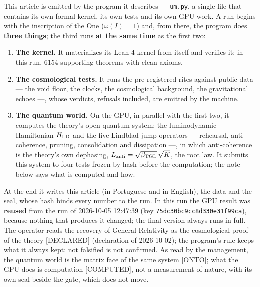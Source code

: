 \documentclass[11pt]{article}
\newcommand{\bTGL}{\beta_{\mathrm{TGL}}}\newcommand{\Msun}{M_{\odot}}\newcommand{\TGL}{\mathrm{TGL}}
\theoremstyle{definition}\newtheorem{deriv}{Derivation}
\begin{document}

This article is emitted by the program it describes --- \texttt{um.py}, a single file that contains its own formal kernel, its own tests and its own GPU work. A run begins with the inscription of the One ($\omega(I)=1$) and, from there, the program does \textbf{three things}; the third runs \textbf{at the same time} as the first two:

\begin{enumerate}

\item \textbf{The kernel.} It materializes its Lean 4 kernel from itself and verifies it: in this run, 6154 supporting theorems with clean axioms.

\item \textbf{The cosmological tests.} It runs the pre-registered rites against public data --- the void floor, the clocks, the cosmological background, the gravitational echoes ---, whose verdicts, refusals included, are emitted by the machine.

\item \textbf{The quantum world.} On the GPU, in parallel with the first two, it computes the theory's open quantum system: the luminodynamic Hamiltonian $H_{\rm LD}$ and the five Lindblad jump operators --- rehearsal, anti-coherence, pruning, consolidation and dissipation ---, in which anti-coherence is the theory's own dephasing, $L_{\rm anti}=\sqrt{\bTGL}\,\sqrt K$, the root law. It submits this system to four tests frozen by hash before the computation; the note below says what is computed and how.

\end{enumerate}

At the end it writes this article (in Portuguese and in English), the data and the seal, whose hash binds every number to the run. In this run the GPU result was \textbf{reused} from the run of 2026-10-05 12:47:39 (key \texttt{75dc30bc9cc8d330e31f99ca}), because nothing that produces it changed; the final version always runs in full. The operator reads the recovery of General Relativity as the cosmological proof of the theory \textsf{[DECLARED]} (declaration of 2026-10-02); the program's rule keeps what it always kept: not falsified is not confirmed. As read by the management, the quantum world is the matrix face of the same system \textsf{[ONTO]}; what the GPU does is computation \textsf{[COMPUTED]}, not a measurement of nature, with its own seal beside the gate, which does not move.
\end{document}
